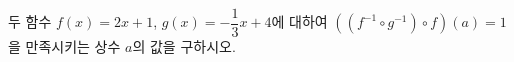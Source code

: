 두 함수 $f(x)=2x+1$, $g(x)=-\dfrac{1}{3}x+4$에 대하여 $((f^{-1}\circ g^{-1})\circ f)(a)=1$을 만족시키는 상수 $a$의 값을 구하시오.
